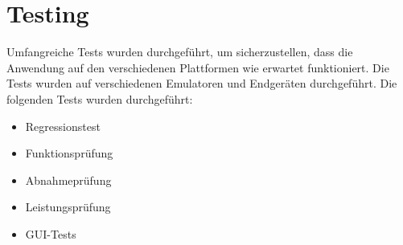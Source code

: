 
\chapter{Testing}

Umfangreiche Tests wurden durchgeführt, um sicherzustellen, dass die Anwendung auf den verschiedenen Plattformen wie erwartet funktioniert.
Die Tests wurden auf verschiedenen Emulatoren und Endgeräten durchgeführt.
Die folgenden Tests wurden durchgeführt:

\begin{itemize}
    \item Regressionstest
    \item Funktionsprüfung
    \item Abnahmeprüfung
    \item Leistungsprüfung
    \item GUI-Tests
\end{itemize}

